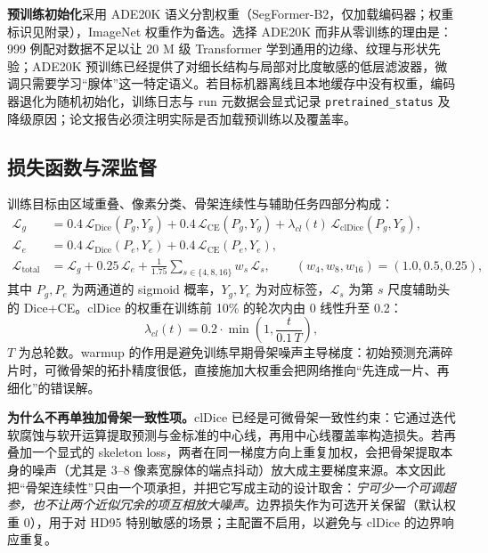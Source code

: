 \textbf{预训练初始化}采用 ADE20K 语义分割权重（SegFormer-B2，仅加载编码器；权重标识见附录），ImageNet 权重作为备选。选择 ADE20K 而非从零训练的理由是：999 例配对数据不足以让 20 M 级 Transformer 学到通用的边缘、纹理与形状先验；ADE20K 预训练已经提供了对细长结构与局部对比度敏感的低层滤波器，微调只需要学习“腺体”这一特定语义。若目标机器离线且本地缓存中没有权重，编码器退化为随机初始化，训练日志与 run 元数据会显式记录 \texttt{pretrained\_status} 及降级原因；论文报告必须注明实际是否加载预训练以及覆盖率。

\subsection{损失函数与深监督}\label{sec:loss}

训练目标由区域重叠、像素分类、骨架连续性与辅助任务四部分构成：
\begin{align}
\mathcal{L}_{g} &= 0.4\,\mathcal{L}_{\mathrm{Dice}}(P_g,Y_g)+0.4\,\mathcal{L}_{\mathrm{CE}}(P_g,Y_g)
+\lambda_{cl}(t)\,\mathcal{L}_{\mathrm{clDice}}(P_g,Y_g),\\
\mathcal{L}_{e} &= 0.4\,\mathcal{L}_{\mathrm{Dice}}(P_e,Y_e)+0.4\,\mathcal{L}_{\mathrm{CE}}(P_e,Y_e),\\
\mathcal{L}_{\mathrm{total}} &= \mathcal{L}_{g}+0.25\,\mathcal{L}_{e}
+\frac{1}{1.75}\sum_{s\in\{4,8,16\}} w_s\,\mathcal{L}_{s},\qquad (w_4,w_8,w_{16})=(1.0,0.5,0.25),
\end{align}
其中 $P_g,P_e$ 为两通道的 sigmoid 概率，$Y_g,Y_e$ 为对应标签，$\mathcal{L}_{s}$ 为第 $s$ 尺度辅助头的 Dice+CE。clDice 的权重在训练前 10\% 的轮次内由 0 线性升至 0.2：
\begin{equation}
\lambda_{cl}(t)=0.2\cdot\min\!\left(1,\frac{t}{0.1\,T}\right),
\end{equation}
$T$ 为总轮数。warmup 的作用是避免训练早期骨架噪声主导梯度：初始预测充满碎片时，可微骨架的拓扑精度很低，直接施加大权重会把网络推向“先连成一片、再细化”的错误解。

\textbf{为什么不再单独加骨架一致性项。}clDice 已经是可微骨架一致性约束：它通过迭代软腐蚀与软开运算提取预测与金标准的中心线，再用中心线覆盖率构造损失\cite{cldice}。若再叠加一个显式的 skeleton loss，两者在同一梯度方向上重复加权，会把骨架提取本身的噪声（尤其是 3--8 像素宽腺体的端点抖动）放大成主要梯度来源。本文因此把“骨架连续性”只由一个项承担，并把它写成主动的设计取舍：\emph{宁可少一个可调超参，也不让两个近似冗余的项互相放大噪声}。边界损失作为可选开关保留（默认权重 0），用于对 HD95 特别敏感的场景；主配置不启用，以避免与 clDice 的边界响应重复。

